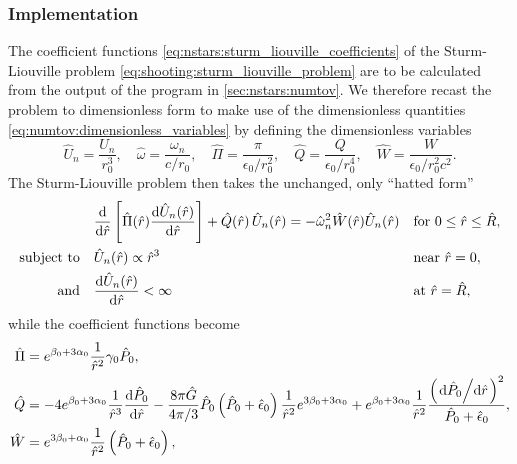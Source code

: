 \subsubsection{Implementation}

The coefficient functions \eqref{eq:nstars:sturm_liouville_coefficients} of the Sturm-Liouville problem \eqref{eq:shooting:sturm_liouville_problem} are to be calculated from the output of the program in \cref{sec:nstars:numtov}.
We therefore recast the problem to dimensionless form to make use of the dimensionless quantities \eqref{eq:numtov:dimensionless_variables} by defining the dimensionless variables
\begin{equation}
	\hat{U}_n    = \frac{U_n}{r_0^3} , \quad
	\hat{\omega} = \frac{\omega_n}{c/r_0} , \quad
	\hat{\Pi}    = \frac{\pi}{\epsilon_0 / r_0^2} , \quad %
	\hat{Q}      = \frac{Q}{\epsilon_0 / r_0^4} , \quad %
	\hat{W}      = \frac{W}{\epsilon_0 / r_0^2 c^2} . %
\label{eq:shooting:dimensionless_variables}
\end{equation}
The Sturm-Liouville problem then takes the unchanged, only ``hatted form''
\begin{subequations}
\begin{align}
	&\odv*{ \left[ \hat{\Pi}(\hat{r}) \odv{\hat{U}_n(\hat{r})}{\hat{r}} \right] }{\hat{r}} + \hat{Q}(\hat{r}) \, \hat{U}_n(\hat{r}) = -\hat{\omega}_n^2 \hat{W}(\hat{r}) \hat{U}_n(\hat{r}) && \text{for } 0 \leq \hat{r} \leq \hat{R} , \\
	\text{subject to} \quad & \hat{U}_n(\hat{r})          \propto \hat{r}^3    && \text{near } \hat{r}=0 , \\
	\text{and}        \quad & \odv{\hat{U}_n(\hat{r})}{\hat{r}} <       \infty && \text{at } \hat{r}=\hat{R} ,
\end{align}%
\end{subequations}
while the coefficient functions become
\begin{subequations}
\begin{align}
	\hat{\Pi} &= e^{\beta_0 + 3 \alpha_0} \frac{1}{\hat{r}^2} \gamma_0 \hat{P}_0 , \\
	\hat{Q}   &= -4 e^{\beta_0 + 3 \alpha_0} \frac{1}{\hat{r}^3} \odv{\hat{P}_0}{\hat{r}} - \frac{8 \pi \hat{G}}{4 \pi / 3} \hat{P}_0 \left( \hat{P}_0 + \hat{\epsilon}_0 \right) \frac{1}{\hat{r}^2} e^{3 \beta_0 + 3 \alpha_0} + e^{\beta_0 + 3 \alpha_0} \frac{1}{\hat{r}^2} \frac{\left( \odv{\hat{P}_0}/{\hat{r}} \right)^2}{\hat{P}_0 + \hat{\epsilon}_0} , \\
	\hat{W}   &= e^{3 \beta_0 + \alpha_0} \frac{1}{\hat{r}^2} \left( \hat{P}_0 + \hat{\epsilon}_0 \right) ,
\end{align}
\end{subequations}
